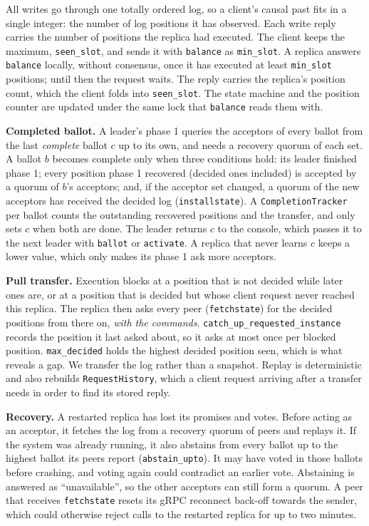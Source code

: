 \documentclass[times, 10pt,twocolumn]{article}
\begin{document}
All writes go through one totally ordered log, so a client's causal past fits
in a single integer: the number of log positions it has observed. Each write
reply carries the number of positions the replica had executed. The client
keeps the maximum, \texttt{seen\_slot}, and sends it with \texttt{balance} as
\texttt{min\_slot}. A replica answers \texttt{balance} locally, without
consensus, once it has executed at least \texttt{min\_slot} positions; until
then the request waits. The reply carries the replica's position count, which
the client folds into \texttt{seen\_slot}. The state machine and the position
counter are updated under the same lock that \texttt{balance} reads them with.


\textbf{Completed ballot.} A leader's phase 1 queries the acceptors of every
ballot from the last \emph{complete} ballot $c$ up to its own, and needs a
recovery quorum of each set. A ballot $b$ becomes complete only when three
conditions hold: its leader finished phase 1; every position phase 1
recovered (decided ones included) is accepted by a quorum of $b$'s acceptors;
and, if the acceptor set changed, a quorum of the new acceptors has received
the decided log (\texttt{installstate}). A \texttt{CompletionTracker} per
ballot counts the outstanding recovered positions and the transfer, and only
sets $c$ when both are done. The leader returns $c$ to the console, which
passes it to the next leader with \texttt{ballot} or \texttt{activate}. A
replica that never learns $c$ keeps a lower value, which only makes its phase
1 ask more acceptors.

\textbf{Pull transfer.} Execution blocks at a position that is not decided
while later ones are, or at a position that is decided but whose client
request never reached this replica. The replica then asks every peer
(\texttt{fetchstate}) for the decided positions from there on, \emph{with the
commands}. \texttt{catch\_up\_requested\_instance} records the position it
last asked about, so it asks at most once per blocked position.
\texttt{max\_decided} holds the highest decided position seen, which is what
reveals a gap. We transfer the log rather than a snapshot. Replay is
deterministic and also rebuilds \texttt{RequestHistory}, which a client
request arriving after a transfer needs in order to find its stored reply.

\textbf{Recovery.} A restarted replica has lost its promises and votes. Before
acting as an acceptor, it fetches the log from a recovery quorum of peers and
replays it. If the system was already running, it also abstains from every
ballot up to the highest ballot its peers report (\texttt{abstain\_upto}). It
may have voted in those ballots before crashing, and voting again could
contradict an earlier vote. Abstaining is answered as ``unavailable'', so the
other acceptors can still form a quorum. A peer that receives
\texttt{fetchstate} resets its gRPC reconnect back-off towards the sender,
which could otherwise reject calls to the restarted replica for up to two
minutes.
\end{document}
